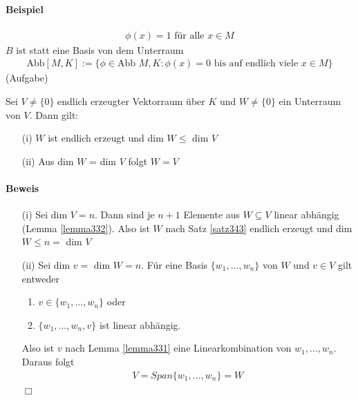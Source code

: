 \documentclass[11pt]{report}
\begin{document}
\paragraph{Beispiel}
\begin{align}
 \phi(x) = 1 \text{ für alle } x\in M
\end{align}
$B$ ist statt eine Basis von dem Unterraum 
\begin{align}
 \text{Abb}[M,K] := \{\phi \in \text{Abb } M,K: \phi(x) = 0\text{ bis auf endlich viele }x\in M\}
\end{align}
(Aufgabe)
\begin{lemma}
 \label{lemma344}
Sei $V\neq \{0\}$ endlich erzeugter Vektorraum über $K$ und $W\neq\{0\}$ ein Unterraum von $V$. Dann gilt:
\begin{itemize}
 \item[(i)] $W$ ist endlich erzeugt und dim $W \leq$ dim $V$
 \item[(ii)] Aus dim $W$ = dim $V$ folgt $W=V$
\end{itemize}
\end{lemma}
\paragraph{Beweis}
\begin{itemize}
 \item[(i)] Sei dim $V=n$. Dann sind je $n+1$ Elemente aus $W\subseteq V$ linear abhängig (Lemma \ref{lemma332}). Also ist $W$ nach Satz \ref{satz343} endlich erzeugt und dim $W \leq n =$ dim $V$
 \item[(ii)] Sei dim $v =$ dim $W = n$. Für eine Basis $\{w_1, ..., w_n\}$ von $W$ und $v \in V$ gilt entweder
\begin{enumerate}
 \item $v \in \{w_1, ..., w_n\}$ oder
 \item $\{w_1, ..., w_n, v\}$ ist linear abhängig.
\end{enumerate}
Also ist $v$ nach Lemma \ref{lemma331} eine Linearkombination von $w_1, ..., w_n$. Daraus folgt
\begin{align}
 V = Span\{w_1, ..., w_n\} = W
\end{align}
\hspace*{1cm}\hfill $\Box$
\end{itemize}
\end{document}
